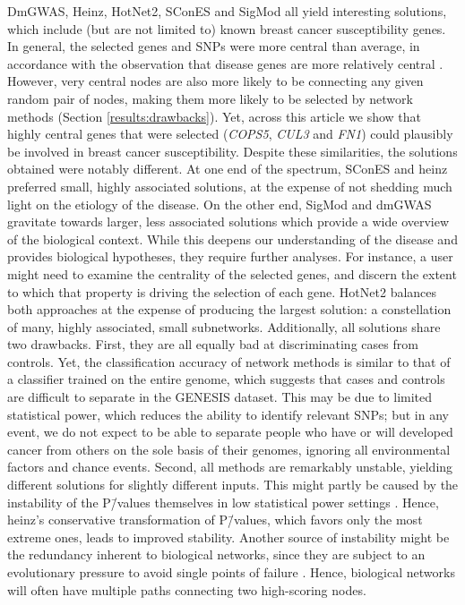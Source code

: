 \documentclass[10pt,letterpaper]{article}
\begin{document}
DmGWAS, Heinz, HotNet2, SConES and SigMod all yield interesting solutions, which include (but are not limited to) known breast cancer susceptibility genes. In general, the selected genes and SNPs were more central than average, in accordance with the observation that disease genes are more relatively central \cite{pinero_uncovering_2016}. However, very central nodes are also more likely to be connecting any given random pair of nodes, making them more likely to be selected by network methods (Section \ref{results:drawbacks}). Yet, across this article we show that highly central genes that were selected (\emph{COPS5}, \emph{CUL3} and \emph{FN1}) could plausibly be involved in breast cancer susceptibility. Despite these similarities, the solutions obtained were notably different. At one end of the spectrum, SConES and heinz preferred small, highly associated solutions, at the expense of not shedding much light on the etiology of the disease. On the other end, SigMod and dmGWAS gravitate towards larger, less associated solutions which provide a wide overview of the biological context. While this deepens our understanding of the disease and provides biological hypotheses, they require further analyses. For instance, a user might need to examine the centrality of the selected genes, and discern the extent to which that property is driving the selection of each gene. HotNet2 balances both approaches at the expense of producing the largest solution: a constellation of many, highly associated, small subnetworks. Additionally, all solutions share two drawbacks. First, they are all equally bad at discriminating cases from controls. Yet, the classification accuracy of network methods is similar to that of a classifier trained on the entire genome, which suggests that cases and controls are difficult to separate in the GENESIS dataset. This may be due to limited statistical power, which reduces the ability to identify relevant SNPs; but in any event, we do not expect to be able to separate people who have or will developed cancer from others on the sole basis of their genomes, ignoring all environmental factors and chance events. Second, all methods are remarkably unstable, yielding different solutions for slightly different inputs. This might partly be caused by the instability of the P\=/values themselves in low statistical power settings \cite{halseyFickleValueGenerates2015}. Hence, heinz's conservative transformation of P\=/values, which favors only the most extreme ones, leads to improved stability. Another source of instability might be the redundancy inherent to biological networks, since they are subject to an evolutionary pressure to avoid single points of failure \cite{wagnerAlternativeRoutesMutational2007}. Hence, biological networks will often have multiple paths connecting two high-scoring nodes. 
\end{document}
